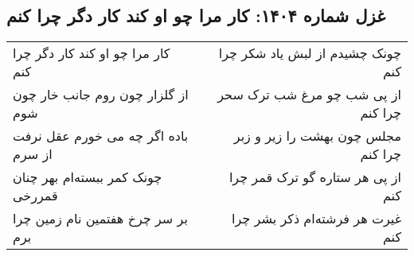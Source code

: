 \begin{center}
\section*{غزل شماره ۱۴۰۴: کار مرا چو او کند کار دگر چرا کنم}
\label{sec:1404}
\begin{longtable}{l p{0.5cm} r}
کار مرا چو او کند کار دگر چرا کنم
&&
چونک چشیدم از لبش یاد شکر چرا کنم
\\
از گلزار چون روم جانب خار چون شوم
&&
از پی شب چو مرغ شب ترک سحر چرا کنم
\\
باده اگر چه می خورم عقل نرفت از سرم
&&
مجلس چون بهشت را زیر و زبر چرا کنم
\\
چونک کمر ببسته‌ام بهر چنان قمررخی
&&
از پی هر ستاره گو ترک قمر چرا کنم
\\
بر سر چرخ هفتمین نام زمین چرا برم
&&
غیرت هر فرشته‌ام ذکر بشر چرا کنم
\\
\end{longtable}
\end{center}
